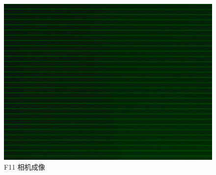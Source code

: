\documentclass{ctexart}
\begin{document}
\begin{figure}[H]
\begin{minipage}[b]{0.3\textwidth}
    \includegraphics[width=\textwidth]{pictures/F11-mask-Ex13.png}
    \caption{F11 相机成像}
  \end{minipage}
\end{figure}
\end{document}
